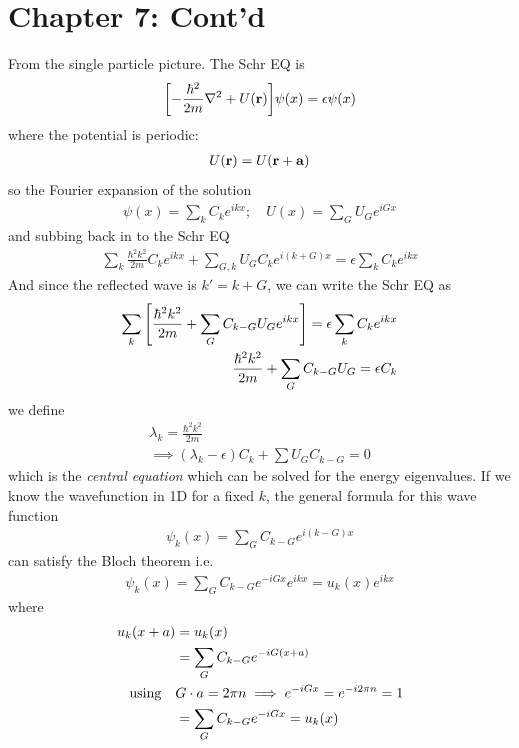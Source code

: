 \documentclass[../main.tex]{subfiles}
\begin{document}
\newpage
{}

\section*{Chapter 7: Cont'd}
From the single particle picture. The Schr EQ is
\begin{align*}
    \qt[-\frac{\hbar^2}{2m} \laplacian + U(\vb r)] \psi(x) = \epsilon \psi(x)
\end{align*}
where the potential is periodic:
\begin{align*}
    U(\vb r) = U(\vb r + \vb a)
\end{align*}
so the Fourier expansion of the solution
\begin{align*}
    \psi(x) = \sum_k C_k e^{ikx} ; \quad U(x) = \sum_G U_G e^{iGx}
\end{align*}
and subbing back in to the Schr EQ
\begin{align*}
    \sum_k \frac{\hbar^2 k^2}{2m} C_k e^{ikx} + \sum_{G, k} U_G C_k e^{i(k+G)x}
        = \epsilon \sum_k C_k e^{ikx}
\end{align*}
And since the reflected wave is $k' = k + G$, we can write the Schr EQ as
\begin{align*}
    \sum_k \qt[\frac{\hbar^2 k^2}{2m} + \sum_G C_{k-G} U_G e^{ikx}] = \epsilon \sum_k C_k e^{ikx} \\
    \frac{\hbar^2 k^2}{2m} + \sum_G C_{k-G} U_G = \epsilon C_k
\end{align*}
we define
\begin{align*}
    \lambda_k = \frac{\hbar^2 k^2}{2m} \\
    \implies (\lambda_k - \epsilon) C_k + \sum U_G C_{k-G} = 0
\end{align*}
which is the \emph{central equation} which can be solved for the energy eigenvalues. If we know the
wavefunction in 1D for a fixed $k$, the general formula for this wave function
\begin{align*}
    \psi_k(x) = \sum_G C_{k-G} e^{i(k-G)x}
\end{align*}
can satisfy the Bloch theorem i.e.
\begin{align*}
    \psi_k(x) = \sum_G C_{k-G} e^{-iGx} e^{ikx} = u_k(x) e^{ikx}
\end{align*}
where
\begin{align*}
    u_k(x + a) &= u_k(x) \\
    &= \sum_G C_{k-G} e^{-iG(x+a)} \\
    \qusing &G\cdot a = 2\pi n \implies e^{-iGx} = e^{-i2\pi n} = 1 \\
    &= \sum_G C_{k-G} e^{-iGx} = u_k(x)
\end{align*}
\end{document}
